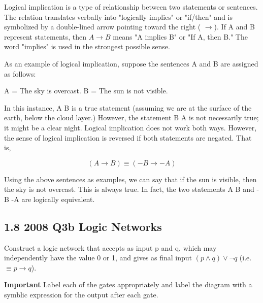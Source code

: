 \documentclass[]{report}
\begin{document}

Logical implication is a type of relationship between two statements or sentences. The relation translates verbally into "logically implies" or "if/then" and is symbolized by a double-lined arrow pointing toward the right ( $\rightarrow$). If A and B represent statements, then $A\rightarrow B$ means "A implies B" or "If A, then B." The word "implies" is used in the strongest possible sense.


As an example of logical implication, suppose the sentences A and B are assigned as follows:

A = The sky is overcast.
B = The sun is not visible.

In this instance, A B is a true statement (assuming we are at the surface of the earth, below the cloud layer.) However, the statement B A is not necessarily true; it might be a clear night. Logical implication does not work both ways. However, the sense of logical implication is reversed if both statements are negated. That is,

$$(A \rightarrow B)  \equiv (-B \rightarrow -A)$$

Using the above sentences as examples, we can say that if the sun is visible, then the sky is not overcast. This is always true. In fact, the two statements A B and -B -A are logically equivalent.

\newpage
\subsection*{1.8 2008 Q3b Logic Networks }
Construct a logic network that accepts as input p and q, which may independently have the value 0 or 1, and
gives as final input $(p \wedge  q) \vee \neg q$ (i.e. $\equiv p \rightarrow q$).



\textbf{Important} Label each of the gates appropriately and label the diagram with a symblic expression for the output after each gate.

\end{document}
